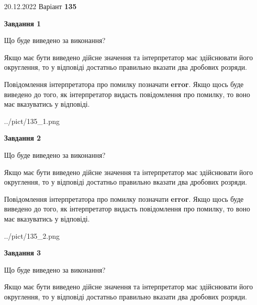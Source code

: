 \documentclass[12pt, ukrainian]{article}
\begin{document}
{20.12.2022 Варіант \No \textbf { 135 }\par}
{
\begin {Large}

{\begin {center}\textbf{Завдання 1}\end {center}}\par
Що буде виведено за виконання? \par

Якщо має бути виведено дійсне значення та інтерпретатор має здійснювати його округлення, 
то у відповіді достатньо правильно вказати два дробових розряди.

Повідомлення інтерпретатора про помилку позначати \textbf{error}.
Якщо щось буде виведено до того, як інтерпретатор видасть повідомлення про помилку, 
то воно має вказуватись у відповіді. \par

\begin{center}
	{../pict/135_1.png}
\end{center}
\newpage

{\begin {center}\textbf{Завдання 2}\end {center}}\par
Що буде виведено за виконання? \par

Якщо має бути виведено дійсне значення та інтерпретатор має здійснювати його округлення, 
то у відповіді достатньо правильно вказати два дробових розряди.

Повідомлення інтерпретатора про помилку позначати \textbf{error}.
Якщо щось буде виведено до того, як інтерпретатор видасть повідомлення про помилку, 
то воно має вказуватись у відповіді. \par

\begin{center}
	{../pict/135_2.png}
\end{center}
\newpage

{\begin {center}\textbf{Завдання 3}\end {center}}\par
Що буде виведено за виконання? \par

Якщо має бути виведено дійсне значення та інтерпретатор має здійснювати його округлення, 
то у відповіді достатньо правильно вказати два дробових розряди.


\end{Large}}
\end{document}
